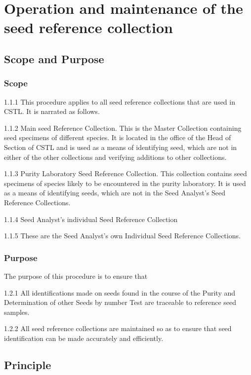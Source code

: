 \documentclass[]{book}
\begin{document}
\chapter{Operation and maintenance of the seed reference
collection}\label{operation-and-maintenance-of-the-seed-reference-collection}

\section{Scope and Purpose}\label{scope-and-purpose-5}

\subsection{Scope}\label{scope-5}

1.1.1 This procedure applies to all seed reference collections that are
used in CSTL. It is narrated as follows.

1.1.2 Main seed Reference Collection. This is the Master Collection
containing seed specimens of different species. It is located in the
office of the Head of Section of CSTL and is used as a means of
identifying seed, which are not in either of the other collections and
verifying additions to other collections.

1.1.3 Purity Laboratory Seed Reference Collection. This collection
contains seed specimens of species likely to be encountered in the
purity laboratory. It is used as a means of identifying seeds, which are
not in the Seed Analyst's Seed Reference Collections.

1.1.4 Seed Analyst's individual Seed Reference Collection

1.1.5 These are the Seed Analyst's own Individual Seed Reference
Collections.

\subsection{Purpose}\label{purpose-3}

The purpose of this procedure is to ensure that

1.2.1 All identifications made on seeds found in the course of the
Purity and Determination of other Seeds by number Test are traceable to
reference seed samples.

1.2.2 All seed reference collections are maintained so as to ensure that
seed identification can be made accurately and efficiently.

\section{Principle}\label{principle-4}
\end{document}
